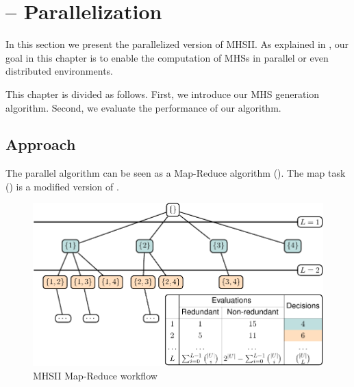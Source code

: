\renewcommand{\BrainFuckChapter}{%
  {+}{+}{+}{+}{+}{+}{+}{+}{[}{>}{+}{+}{+}{+}{>}{+}{+}{+}{+}{+}{+}{>}{+}{+}{+}{+}{+}{+}{+}{+}{>}{+}{+}{+}{+}{+}{+}{+}{+}{+}{+}{>}{+}{+}{+}{+}{+}{+}{+}{+}{+}{+}{+}{+}{<}{<}{<}{<}{<}{-}{]}{>}{>}{>}{>}{-}{-}{-}{.}{-}
  {-}{-}{-}{-}{.}{+}{+}{+}{+}{+}{+}{+}{+}{+}{+}{+}{.}{<}{<}{+}{+}{.}{<}{.}{>}{-}{-}{-}{-}{-}{.}{<}{.}{>}{>}{>}{-}{-}{-}{.}{>}{+}{.}{+}{+}{+}{+}{+}{+}{+}{+}{+}{+}{+}{+}{+}{+}{+}{+}{+}{.}{<}{+}{+}{+}{+}{+}{+}{+}{+}
  {+}{+}{+}{+}{+}{+}{+}{+}{+}{.}{>}{-}{-}{-}{-}{-}{-}{.}{.}{<}{+}{+}{+}{+}{.}{>}{.}{-}{-}{-}{.}{+}{+}{+}{+}{+}{+}{+}{+}{+}{+}{+}{+}{+}{+}{+}{+}{+}{.}{<}{-}{-}{-}{-}{.}{>}{-}{-}{-}{-}{-}{-}{.}{<}{+}{+}{+}{+}{+}{+}
  {+}{+}{.}{>}{-}{-}{-}{-}{-}{.}{-}{.}{[}{>}{]}{<}{[}{[}{-}{]}{<}{]}{+}{-}{>}{-}{>}{-}{>}{-}{<}{>}{-}{-}{>}{>}{>}{+}{>}{>}{-}{+}{<}{>}{-}{>}{+}{+}{+}{-}{>}{>}{-}{+}{-}{>}{>}{>}{<}{>}{<}{<}{<}{>}{+}{<}{<}{<}{>}{<}
}
\renewcommand{\LifeChapter}{y}

\newcommand{\strideFn}{\emph{Stride}}
\newcommand{\randomFn}{\emph{Random}}
\newcommand{\nproc}{\mathit{np}}

\chapter{\mhsII{} -- Parallelization}
\label{sec:mhs2p}
In this section we present the parallelized version of \ac{MHSII}.
%
As explained in
, our
goal in this chapter is to enable the computation of \acp{MHS} in
parallel or even distributed environments.


This chapter is divided as follows.
%
First, we introduce our \ac{MHS} generation algorithm.
%
Second, we evaluate the performance of our algorithm.

\section{Approach}
\label{sec:mhs2p:approach}
The parallel algorithm can be seen as a Map-Reduce algorithm
\citep{Dean04} ().
%
The map task () is a modified version of
.

\begin{figure}[!ht]
  \includegraphics[page=5]{figures/mhs2/figures/parallel/main}
  \caption{\acs{MHSII} Map-Reduce workflow\label{fig:mhs2p:map-reduce}}
\end{figure}



